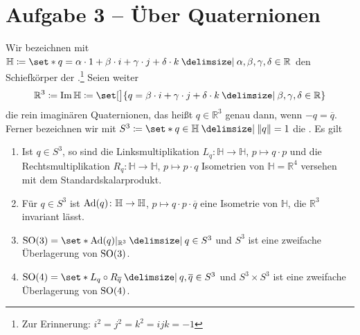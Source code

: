 \section{Aufgabe 3 -- Über Quaternionen} %
\label{sec:aufg3}
Wir bezeichnen mit $\mathbb{H} \coloneqq \set*{q = \alpha \cdot 1 + \beta \cdot i + \gamma \cdot j + \delta \cdot k \given \alpha, \beta, \gamma, \delta \in \mathbb{R}}$ den Schiefkörper der .\footnote{Zur Erinnerung: $i^2 = j^2 = k^2 = ijk = -1$}
Seien weiter
\[
	\mathbb{R}^3 \coloneqq \Im \mathbb{H} \coloneqq \set[\big]{q = \beta \cdot i + \gamma \cdot j + \delta \cdot k \given \beta,\gamma,\delta \in \mathbb{R}}
\]
die rein imaginären Quaternionen, das heißt $q \in \mathbb{R}^3$ genau dann, wenn $-q = \overline{q}$.
Ferner bezeichnen wir mit $S^3 \coloneqq \set*{q \in \mathbb{H} \given \norm*{q}=1}$ die .
Es gilt
\begin{enumerate}[(1)]
	\item Ist $q \in S^3$, so sind die Linksmultiplikation $L_q \colon \mathbb{H} \to \mathbb{H}$, $p \mapsto q \cdot p$ und die Rechtsmultiplikation $R_q \colon \mathbb{H} \to \mathbb{H}$, $p \mapsto p \cdot q$ Isometrien von $\mathbb{H}=\mathbb{R}^4$ versehen mit dem Standardskalarprodukt.
	\item Für $q \in S^3$ ist $\operatorname{Ad}(q) \colon \mathbb{H} \to \mathbb{H}$, $p \mapsto q \cdot p \cdot \overline{q}$ eine Isometrie von $\mathbb{H}$, die $\mathbb{R}^3$ invariant lässt.
	\item $\SO(3) = \set*{\Ad(q)|_{\mathbb{R}^3} \given q \in S^3}$ und $S^3$ ist eine zweifache Überlagerung von $\operatorname{SO}(3)$.
	\item $\SO(4) = \set*{L_q \circ R_{\overline{q}} \given q,\overline{q} \in S^3}$ und $S^3 \times S^3$ ist eine zweifache Überlagerung von $\operatorname{SO}(4)$.
\end{enumerate}
